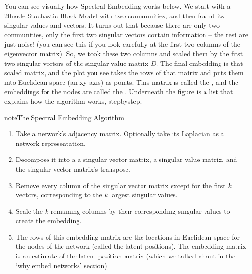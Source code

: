 \documentclass[letterpaper,10pt,english]{jupyterBook}
\begin{document}
\sphinxAtStartPar
You can see visually how Spectral Embedding works below. We start with a 20\sphinxhyphen{}node Stochastic Block Model with two communities, and then found its singular values and vectors. It turns out that because there are only two communities, only the first two singular vectors contain information – the rest are just noise! (you can see this if you look carefully at the first two columns of the eigenvector matrix). So, we took these two columns and scaled them by the first two singular vectors of the singular value matrix \(D\). The final embedding is that scaled matrix, and the plot you see takes the rows of that matrix and puts them into Euclidean space (an x\sphinxhyphen{}y axis) as points. This matrix is called the , and the embeddings for the nodes are called the . Underneath the figure is a list that explains how the algorithm works, step\sphinxhyphen{}by\sphinxhyphen{}step.

\noindent{}

\begin{sphinxadmonition}{note}{The Spectral Embedding Algorithm}
\begin{enumerate}
%
\item {} 
\sphinxAtStartPar
Take a network’s adjacency matrix. Optionally take its Laplacian as a network representation.

\item {} 
\sphinxAtStartPar
Decompose it into a a singular vector matrix, a singular value matrix, and the singular vector matrix’s transpose.

\item {} 
\sphinxAtStartPar
Remove every column of the singular vector matrix except for the first \(k\) vectors, corresponding to the \(k\) largest singular values.

\item {} 
\sphinxAtStartPar
Scale the \(k\) remaining columns by their corresponding singular values to create the embedding.

\item {} 
\sphinxAtStartPar
The rows of this embedding matrix are the locations in Euclidean space for the nodes of the network (called the latent positions). The embedding matrix is an estimate of the latent position matrix (which we talked about in the ‘why embed networks’ section)

\end{enumerate}
\end{sphinxadmonition}
\end{document}
